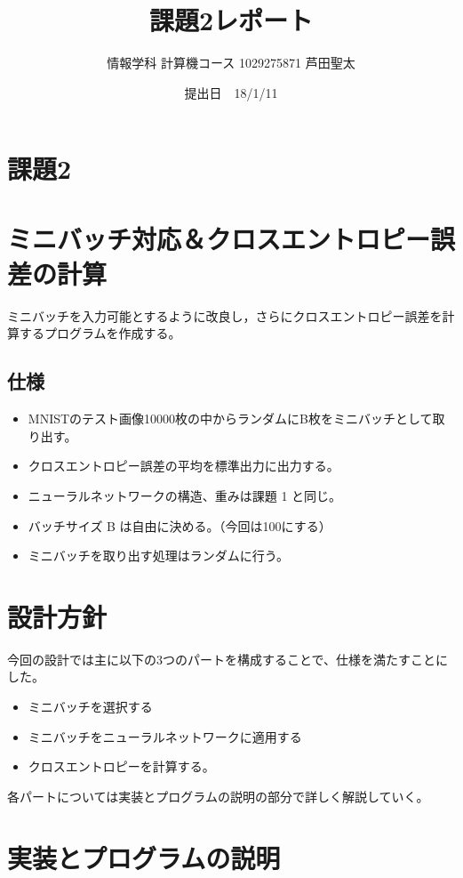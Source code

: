 \documentclass{ujarticle}
\title {課題2レポート}
\author{情報学科 計算機コース 1029275871 芦田聖太}
\date{提出日　18/1/11}
\begin{document}
\begin{titlepage}
\maketitle
\thispagestyle{empty}
\end{titlepage}


\section*{課題2}
\section{ミニバッチ対応＆クロスエントロピー誤差の計算}
ミニバッチを入力可能とするように改良し，さらにクロスエントロピー誤差を計算するプログラムを作成する。

\subsection*{仕様}
\begin{itemize}
\item MNISTのテスト画像10000枚の中からランダムにB枚をミニバッチとして取り出す。
\item クロスエントロピー誤差の平均を標準出力に出力する。
\item ニューラルネットワークの構造、重みは課題 1 と同じ。
\item バッチサイズ B は自由に決める。（今回は100にする）
\item ミニバッチを取り出す処理はランダムに行う。
\end{itemize}


\section{設計方針}
今回の設計では主に以下の3つのパートを構成することで、仕様を満たすことにした。
\begin{itemize}
\item ミニバッチを選択する
\item ミニバッチをニューラルネットワークに適用する
\item クロスエントロピーを計算する。
\end{itemize}
各パートについては実装とプログラムの説明の部分で詳しく解説していく。

\section{実装とプログラムの説明}
\end{document}
